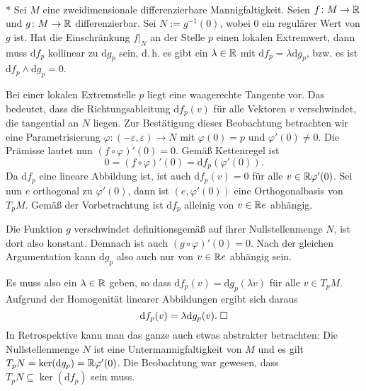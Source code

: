 \begin{theorem}\mbox{}\\*
Sei $M$ eine zweidimensionale differenzierbare Mannigfaltigkeit.
Seien $f\colon M\to\mathbb R$ und $g\colon M\to\mathbb R$
differenzierbar. Sei $N:=g^{-1}(0)$, wobei 0 ein regulärer Wert 
von $g$ ist. Hat die Einschränkung $f|_N$ an der Stelle $p$ einen
lokalen Extremwert, dann muss $\mathrm df_p$ kollinear zu
$\mathrm dg_p$ sein, d.\,h. es gibt ein $\lambda\in\mathbb R$ mit
$\mathrm df_p = \lambda\mathrm dg_p$, bzw. es ist
$\mathrm df_p\land\mathrm dg_p=0$.
\end{theorem}
\noindent{}
Bei einer lokalen Extremstelle $p$ liegt eine waagerechte Tangente vor.
Das bedeutet, dass die Richtungsableitung $\mathrm df_p(v)$ für alle
Vektoren $v$ verschwindet, die tangential an $N$ liegen. Zur
Bestätigung dieser Beobachtung betrachten wir eine Parametrisierung
$\varphi\colon (-\varepsilon,\varepsilon) \to N$ mit
$\varphi(0)=p$ und $\varphi'(0)\ne 0$. Die Prämisse lautet nun
$(f\circ\varphi)'(0)=0$. Gemäß Kettenregel ist
\begin{equation}
0 = (f\circ\varphi)'(0) =  \mathrm df_p(\varphi'(0)).
\end{equation}
Da $\mathrm df_p$ eine lineare Abbildung ist, ist
auch $\mathrm df_p(v)=0$ für alle $v\in\mathbb R\varphi'(0)$.
Sei nun $e$ orthogonal zu $\varphi'(0)$, dann ist
$(e,\varphi'(0))$ eine Orthogonalbasis von $T_p M$. Gemäß der
Vorbetrachtung ist $\mathrm df_p$ alleinig von $v\in\mathbb R e$ abhängig.

Die Funktion $g$ verschwindet definitionsgemäß auf ihrer
Nullstellenmenge $N$, ist dort also konstant. Demnach
ist auch $(g\circ\varphi)'(0)=0$. Nach der gleichen Argumentation
kann $\mathrm dg_p$ also auch nur von $v\in\mathbb R e$ abhängig sein.

Es muss also ein $\lambda\in\mathbb R$ geben, so dass
$\mathrm df_p(v) = \mathrm dg_p(\lambda v)$ für alle $v\in T_p M$.
Aufgrund der Homogenität linearer Abbildungen ergibt sich daraus
\begin{equation}
\mathrm df_p(v) = \lambda\mathrm dg_p(v).\;\Box
\end{equation}
In Retrospektive kann man das ganze auch etwas abstrakter
betrachten: Die Nullstellenmenge $N$ ist eine Untermannigfaltigkeit von
$M$ und es gilt $T_p N=\operatorname{ker}(\mathrm dg_p)=\mathbb R\varphi'(0)$.
Die Beobachtung war gewesen, dass
$T_p N\subseteq \operatorname{ker}(\mathrm df_p)$
sein muss.

